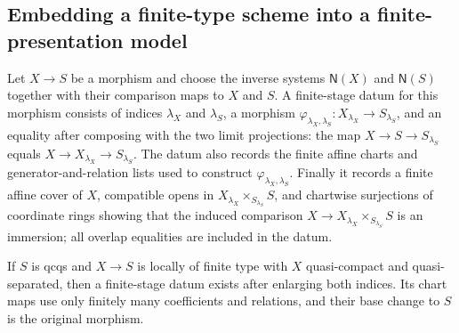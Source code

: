 \subsection{Embedding a finite-type scheme into a finite-presentation model}

\begin{definition}
  \label{def:nagata-relative-stage-morphism-data}

  Let $X\to S$ be a morphism and choose the inverse systems
  $\mathsf N(X)$ and $\mathsf N(S)$ together with their comparison maps to
  $X$ and $S$.  A finite-stage datum for this morphism consists of indices
  $\lambda_X$ and $\lambda_S$, a morphism
  $\varphi_{\lambda_X,\lambda_S}\colon X_{\lambda_X}\to S_{\lambda_S}$,
  and an equality after composing with the two limit projections: the map
  $X\to S\to S_{\lambda_S}$ equals
  $X\to X_{\lambda_X}\to S_{\lambda_S}$.  The datum also records the finite
  affine charts and generator-and-relation lists used to construct
  $\varphi_{\lambda_X,\lambda_S}$.  Finally it records a finite affine cover
  of $X$, compatible opens in
  $X_{\lambda_X}\times_{S_{\lambda_S}}S$, and chartwise surjections of
  coordinate rings showing that the induced comparison
  $X\to X_{\lambda_X}\times_{S_{\lambda_S}}S$ is an immersion; all overlap
  equalities are included in the datum.
\end{definition}

\begin{lemma}
  \label{lemma:nagata-relative-stage-morphism-data-exists}

  If $S$ is qcqs and $X\to S$ is locally of finite type with $X$
  quasi-compact and quasi-separated, then a finite-stage datum exists after enlarging both
  indices.  Its chart maps use only finitely many coefficients and relations,
  and their base change to $S$ is the original morphism.
\end{lemma}

